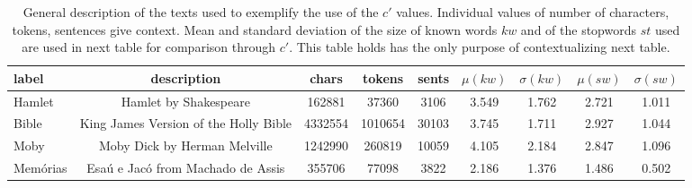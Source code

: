 \begin{table*}[h!]
\begin{center}
\begin{tabular}{| l | c | c | c | c | c | c | c | c |}\hline
label & description & chars & tokens & sents & $\mu(kw)$ & $\sigma(kw)$ & $\mu(sw)$ & $\sigma(sw)$ \\\hline
Hamlet & Hamlet by Shakespeare & 162881 & 37360 & 3106 & 3.549 & 1.762 & 2.721 & 1.011 \\\hline
Bible & King James Version of the Holly Bible & 4332554 & 1010654 & 30103 & 3.745 & 1.711 & 2.927 & 1.044 \\\hline
Moby & Moby Dick by Herman Melville & 1242990 & 260819 & 10059 & 4.105 & 2.184 & 2.847 & 1.096 \\\hline
Mem\'orias & Esa\'u e Jac\'o from Machado de Assis & 355706 & 77098 & 3822 & 2.186 & 1.376 & 1.486 & 0.502 \\\hline
\end{tabular}
\caption{General description of the texts used to exemplify the use of the $c'$ values. Individual values of number of characters, tokens, sentences give context. Mean and standard deviation of the size of known words $kw$ and of the stopwords $st$ used are used in next table for comparison through $c'$. This table holds has the only purpose of contextualizing next table.}
\end{center}
\end{table*}